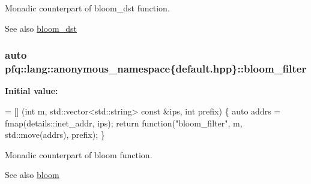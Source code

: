 Monadic counterpart of {\ttfamily bloom\+\_\+dst} function. 

\begin{DoxySeeAlso}{See also}
\hyperlink{namespacepfq_1_1lang_1_1anonymous__namespace_02default_8hpp_03_ac1c667000a13acfbda8490d5748b91c4}{bloom\+\_\+dst} 
\end{DoxySeeAlso}
\subsubsection[{\texorpdfstring{bloom\+\_\+filter}{bloom_filter}}]{\setlength{\rightskip}{0pt plus 5cm}auto pfq\+::lang\+::anonymous\+\_\+namespace\{default.\+hpp\}\+::bloom\+\_\+filter}\hypertarget{namespacepfq_1_1lang_1_1anonymous__namespace_02default_8hpp_03_a3a5eda5d7a49e279941725df8388378d}{}\label{namespacepfq_1_1lang_1_1anonymous__namespace_02default_8hpp_03_a3a5eda5d7a49e279941725df8388378d}
{\bfseries Initial value\+:}
\begin{DoxyCode}
= [] (\textcolor{keywordtype}{int} m, std::vector<std::string> \textcolor{keyword}{const} &ips, \textcolor{keywordtype}{int} prefix) \{
                                    \textcolor{keyword}{auto} addrs = fmap(details::inet\_addr, ips);
                                    \textcolor{keywordflow}{return} \textcolor{keyword}{function}(\textcolor{stringliteral}{"bloom\_filter"}, m, std::move(addrs), prefix);
                                \}
\end{DoxyCode}


Monadic counterpart of {\ttfamily bloom} function. 

\begin{DoxySeeAlso}{See also}
\hyperlink{namespacepfq_1_1lang_1_1anonymous__namespace_02default_8hpp_03_abfcd230137acb93cfd99f7a0a7c1f17f}{bloom} 
\end{DoxySeeAlso}
